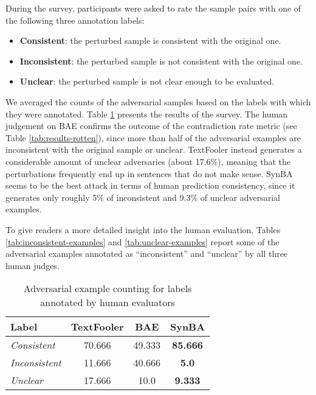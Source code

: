 During the survey, participants were asked to rate the sample pairs with one of the following three annotation labels: 
\begin{itemize}
    \item \textbf{Consistent}: the perturbed sample is consistent with the original one.
    \item \textbf{Inconsistent}: the perturbed sample is not consistent with the original one.
    \item \textbf{Unclear}: the perturbed sample is not clear enough to be evaluated.
\end{itemize}

We averaged the counts of the adversarial samples based on the labels with which they were annotated. Table \ref{tab:human-evaluation} presents the results of the survey.
The human judgement on BAE confirms the outcome of the contradiction rate metric (see Table \ref{tab:results-rotten}), since more than half of the adversarial examples are inconsistent with the original sample or unclear.
TextFooler instead generates a considerable amount of unclear adversaries (about 17.6\%), meaning that the perturbations frequently end up in sentences that do not make sense.
SynBA seems to be the best attack in terms of human prediction consistency, since it generates only roughly 5\% of inconsistent and 9.3\% of unclear adversarial examples.

To give readers a more detailed insight into the human evaluation, Tables \ref{tab:inconsistent-examples} and \ref{tab:unclear-examples} report some of the adversarial examples annotated as “inconsistent” and “unclear” by all three human judges.

\begin{table}[h]
    \footnotesize
    \centering
    \begin{tabular}{|l|c|c|c|}
        \hline
        {Label} &            \textbf{TextFooler} &   \textbf{BAE} &    \textbf{SynBA} \\
        \hline \hline
        \emph{Consistent}            &  70.666 &   49.333 &   \textbf{85.666} \\
        \hline
        \emph{Inconsistent}               &  11.666 &   40.666 &  \textbf{5.0}  \\
        \hline
        \emph{Unclear}    &  17.666 &   10.0 &  \textbf{9.333}\\
        \hline
        \end{tabular}
    \caption{Adversarial example counting for labels annotated by human evaluators}
    \label{tab:human-evaluation}
\end{table}


